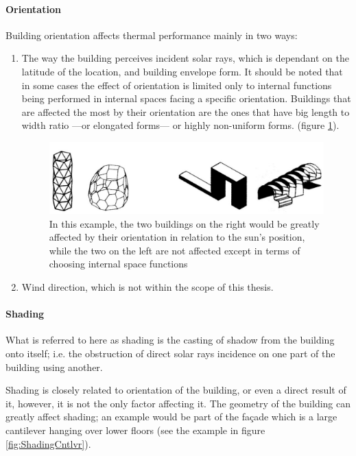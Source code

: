 \paragraph{Orientation}\mbox{}

Building orientation affects thermal performance mainly in two ways:
\begin{enumerate}
	\item The way the building perceives incident solar rays, which is dependant on the latitude of the location, and building envelope form. It should be noted that in some cases the effect of orientation is limited only to internal functions being performed in internal spaces facing a specific orientation. Buildings that are affected the most by their orientation are the ones that have big length to width ratio ---or elongated forms--- or highly non-uniform forms. (figure \ref{fig:orientation}).
		\begin{figure}[h]
			\centering
			\includegraphics[width=13cm]{./Images/6-Orientation}
			\caption[Effect of Building Orientation]{In this example, the two buildings on the right would be greatly affected by their orientation in relation to the sun's position, while the two on the left are not affected except in terms of choosing internal space functions \cite{foa04}}
			\label{fig:orientation}
		\end{figure}
	\item Wind direction, which is not within the scope of this thesis.
\end{enumerate}

\paragraph{Shading}\mbox{}

What is referred to here as shading is the casting of shadow from the building onto itself; i.e. the obstruction of direct solar rays incidence on one part of the building using another.

Shading is closely related to orientation of the building, or even a direct result of it, however, it is not the only factor affecting it. The geometry of the building can greatly affect shading; an example would be part of the fa\c{c}ade which is a large cantilever hanging over lower floors (see the example in figure \ref{fig:ShadingCntlvr}).

